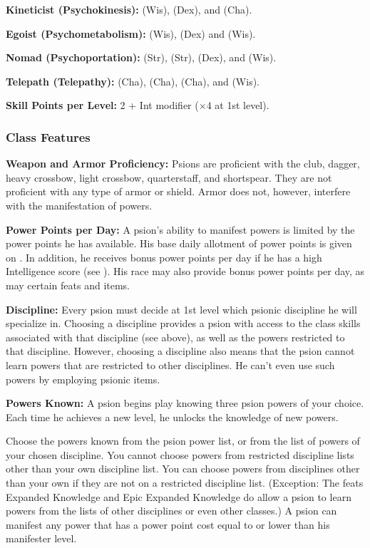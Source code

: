 \textbf{Kineticist (Psychokinesis):}  (Wis),  (Dex), and  (Cha).

\textbf{Egoist (Psychometabolism):}  (Wis),  (Dex) and  (Wis).

\textbf{Nomad (Psychoportation):}  (Str),  (Str),  (Dex), and  (Wis).

\textbf{Telepath (Telepathy):}  (Cha),  (Cha),  (Cha), and  (Wis).

\textbf{Skill Points per Level:} 2 + Int modifier ($\times 4$ at 1st level).

\subsubsection{Class Features}

\textbf{Weapon and Armor Proficiency:} Psions are proficient with the club, dagger, heavy crossbow, light crossbow, quarterstaff, and shortspear. They are not proficient with any type of armor or shield. Armor does not, however, interfere with the manifestation of powers.

\textbf{Power Points per Day:} A psion's ability to manifest powers is limited by the power points he has available. His base daily allotment of power points is given on . In addition, he receives bonus power points per day if he has a high Intelligence score (see ). His race may also provide bonus power points per  day, as may certain feats and items.

\textbf{Discipline:} Every psion must decide at 1st level which psionic discipline he will specialize in. Choosing a discipline provides a psion with access to the class skills associated with that discipline (see above), as well as the powers restricted to that discipline. However, choosing a discipline also means that the psion cannot learn powers that are restricted to other disciplines. He can't even use such powers by employing psionic items.

\textbf{Powers Known:} A psion begins play knowing three psion powers of your choice. Each time he achieves a new level, he unlocks the knowledge of new powers.

Choose the powers known from the psion power list, or from the list of powers of your chosen discipline. You cannot choose powers from restricted discipline lists other than your own discipline list. You can choose powers from disciplines other than your own if they are not on a restricted discipline list. (Exception: The feats Expanded Knowledge and Epic Expanded Knowledge do allow a psion to learn powers from the lists of other disciplines or even other classes.) A psion can manifest any power that has a power point cost equal to or lower than his manifester level.

